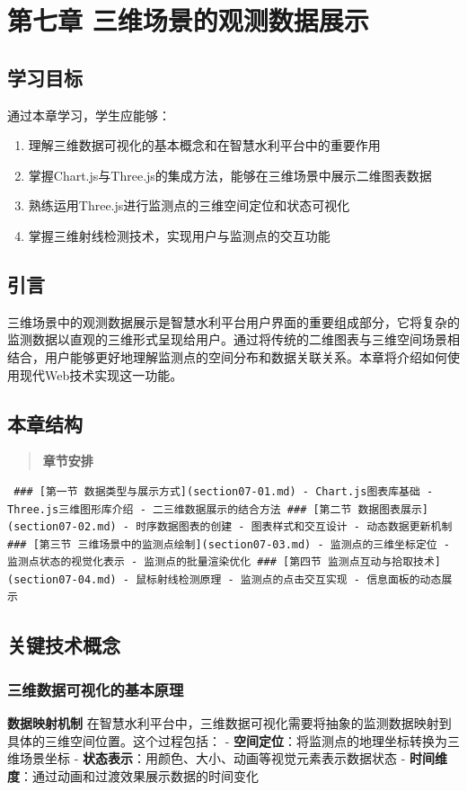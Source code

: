 \section{第七章 三维场景的观测数据展示}\label{ux7b2cux4e03ux7ae0-ux4e09ux7ef4ux573aux666fux7684ux89c2ux6d4bux6570ux636eux5c55ux793a} \subsection{学习目标}\label{ux5b66ux4e60ux76eeux6807} 通过本章学习，学生应能够： \begin{enumerate} \def\labelenumi{\arabic{enumi}.} \item 理解三维数据可视化的基本概念和在智慧水利平台中的重要作用 \item 掌握Chart.js与Three.js的集成方法，能够在三维场景中展示二维图表数据 \item 熟练运用Three.js进行监测点的三维空间定位和状态可视化 \item 掌握三维射线检测技术，实现用户与监测点的交互功能 \end{enumerate} \subsection{引言}\label{ux5f15ux8a00} 三维场景中的观测数据展示是智慧水利平台用户界面的重要组成部分，它将复杂的监测数据以直观的三维形式呈现给用户。通过将传统的二维图表与三维空间场景相结合，用户能够更好地理解监测点的空间分布和数据关联关系。本章将介绍如何使用现代Web技术实现这一功能。 \subsection{本章结构}\label{ux672cux7ae0ux7ed3ux6784} \begin{quote} \textbf{章节安排} \end{quote} \begin{verbatim} ### [第一节 数据类型与展示方式](section07-01.md) - Chart.js图表库基础 - Three.js三维图形库介绍 - 二三维数据展示的结合方法 ### [第二节 数据图表展示](section07-02.md) - 时序数据图表的创建 - 图表样式和交互设计 - 动态数据更新机制 ### [第三节 三维场景中的监测点绘制](section07-03.md) - 监测点的三维坐标定位 - 监测点状态的视觉化表示 - 监测点的批量渲染优化 ### [第四节 监测点互动与拾取技术](section07-04.md) - 鼠标射线检测原理 - 监测点的点击交互实现 - 信息面板的动态展示 \end{verbatim} \subsection{关键技术概念}\label{ux5173ux952eux6280ux672fux6982ux5ff5} \subsubsection{三维数据可视化的基本原理}\label{ux4e09ux7ef4ux6570ux636eux53efux89c6ux5316ux7684ux57faux672cux539fux7406} \textbf{数据映射机制} 在智慧水利平台中，三维数据可视化需要将抽象的监测数据映射到具体的三维空间位置。这个过程包括： - \textbf{空间定位}：将监测点的地理坐标转换为三维场景坐标 - \textbf{状态表示}：用颜色、大小、动画等视觉元素表示数据状态 - \textbf{时间维度}：通过动画和过渡效果展示数据的时间变化 